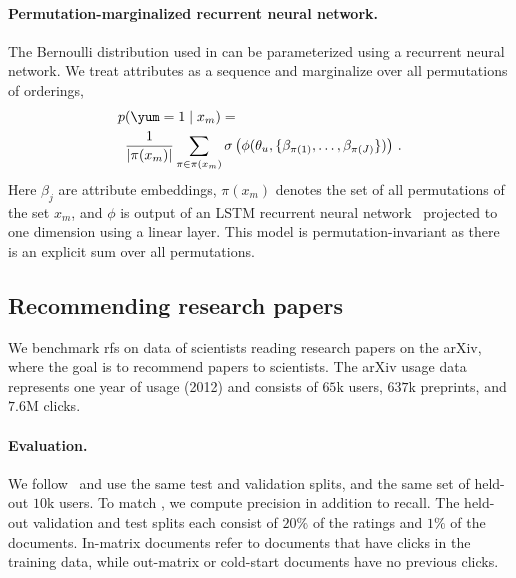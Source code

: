 \paragraph{Permutation-marginalized recurrent neural network.} The Bernoulli
distribution used in  can be parameterized using a
recurrent neural network. We treat attributes as a sequence and marginalize over
all permutations of orderings,
\begin{equation}
\label{eq:lstm}
\begin{aligned}
  p&(\yum = 1 \mid x_m) = \\
  &\frac{1}{\lvert \pi(x_m) \rvert}\sum_{\pi \in \pi(x_m)}\sigma
    \left(\phi(\theta_u,\{\beta_{\pi(1)}, \ldots, \beta_{\pi(J)}\})\right) \, .
\end{aligned}
\end{equation}
Here $\beta_j$ are attribute embeddings, $\pi(x_m)$ denotes the set of all
permutations of the set $x_m$, and $\phi$ is output of an LSTM recurrent neural
network~\citep{hochreiter1997long} projected to one dimension using a linear
layer. This model is permutation-invariant as there is an explicit sum over all
permutations.

\subsection{Recommending research papers}
\label{sec:experiments_arxiv}
We benchmark \gls{rfs} on data of scientists reading research
papers on the arXiv, where the goal is to recommend papers to scientists. The
arXiv usage data represents one year of usage (2012) and consists of $65$k
users, $637$k preprints, and $7.6$M clicks.

\paragraph{Evaluation.} We follow~\citet{gopalan2014content-based} and use the
same test and validation splits, and the same set of held-out $10$k users. To
match \citet{gopalan2014content-based}, we compute precision in addition to recall. The held-out
validation and test splits each consist of $20\%$ of the ratings and $1\%$ of
the documents. In-matrix documents refer to documents that have clicks in the
training data, while out-matrix or cold-start documents have no previous clicks.

